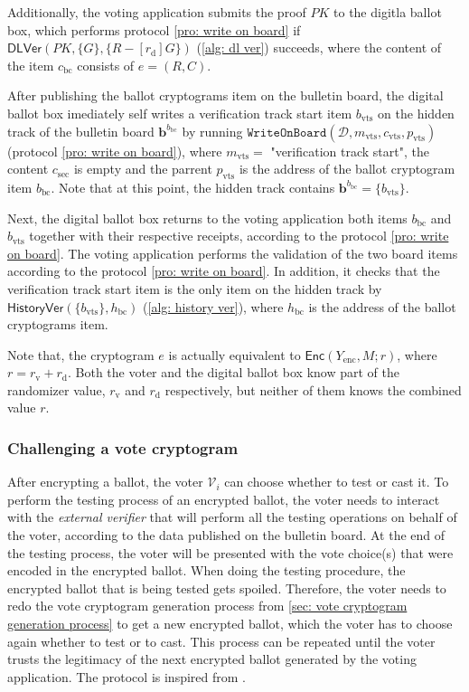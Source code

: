 Additionally, the voting application submits the proof $PK$ to the digitla ballot box, which performs protocol \ref{pro: write on board} if $\mathsf{DLVer}(PK, \{ G \}, \{ R - [r_\mathrm{d}]G \})$ (\cref{alg: dl ver}) succeeds, where the content of the item  $c_\mathrm{bc}$ consists of $e = (R, C)$.

After publishing the ballot cryptograms item on the bulletin board, the digital ballot box imediately self writes a verification track start item $b_\mathrm{vts}$ on the hidden track of the bulletin board $\boldsymbol{b}^{b_\mathrm{bc}}$ by running $\mathtt{WriteOnBoard}(\mathcal{D}, m_\mathrm{vts}, c_\mathrm{vts}, p_\mathrm{vts})$ (protocol \ref{pro: write on board}), where $m_\mathrm{vts} =$ "verification track start", the content $c_\mathrm{sec}$ is empty and the parrent $p_\mathrm{vts}$ is the address of the ballot cryptogram item $b_\mathrm{bc}$. Note that at this point, the hidden track contains $\boldsymbol{b}^{b_\mathrm{bc}} = \{ b_\mathrm{vts} \}$.

Next, the digital ballot box returns to the voting application both items $b_\mathrm{bc}$ and $b_\mathrm{vts}$ together with their respective receipts, according to the protocol \ref{pro: write on board}. The voting application performs the validation of the two board items according to the protocol \ref{pro: write on board}. In addition, it checks that the verification track start item is the only item on the hidden track by $\mathsf{HistoryVer}(\{ b_\mathrm{vts} \}, h_\mathrm{bc})$ (\cref{alg: history ver}), where $h_\mathrm{bc}$ is the address of the ballot cryptograms item.

Note that, the cryptogram $e$ is actually equivalent to $\mathsf{Enc}(Y_\mathrm{enc}, M; r)$, where $r = r_\mathrm{v} + r_\mathrm{d}$. Both the voter and the digital ballot box know part of the randomizer value, $r_\mathrm{v}$ and $r_\mathrm{d}$ respectively, but neither of them knows the combined value $r$.


\subsubsection{Challenging a vote cryptogram} \label{sec: challenging a vote cryptogram}
After encrypting a ballot, the voter $\mathcal{V}_i$ can choose whether to test or cast it. To perform the testing process of an encrypted ballot, the voter needs to interact with the \textit{external verifier} that will perform all the testing operations on behalf of the voter, according to the data published on the bulletin board. At the end of the testing process, the voter will be presented with the vote choice(s) that were encoded in the encrypted ballot. When doing the testing procedure, the encrypted ballot that is being tested gets spoiled. Therefore, the voter needs to redo the vote cryptogram generation process from \cref{sec: vote cryptogram generation process} to get a new encrypted ballot, which the voter has to choose again whether to test or to cast. This process can be repeated until the voter trusts the legitimacy of the next encrypted ballot generated by the voting application. The protocol is inspired from \cite{Benaloh06}.

